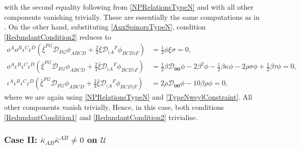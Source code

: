 \documentclass[10pt,a4paper]{article}
\newcommand\omicron{o}
\theoremstyle{plain}
\begin{document}
with the second equality following from \eqref{NPRelationsTypeN} and
with all other components vanishing trivially. These are essentially
the same computations as in \cite{BaeVal10c}. On the other hand,
substituting \eqref{AuxSpinorsTypeN}, condition
\eqref{RedundantCondition2} reduces to
\begin{align*}
\omicron^A\omicron^B\iota^C\iota^D\left(\bar{\xi}^{FG}\mathcal{D}_{FG}\phi_{ABCD}
+
\tfrac{2}{3}\bar{\xi}\mathcal{D}_{(A}{}^F\phi_{BCD)F}\right)&=\tfrac{1}{3}\phi
\xi
\sigma=0,\\ \omicron^A\iota^B\iota^C\iota^D\left(\bar{\xi}^{FG}\mathcal{D}_{FG}\phi_{ABCD}
+ \tfrac{2}{3}\bar{\xi}\mathcal{D}_{(A}{}^F\phi_{BCD)F}\right)&=
\tfrac{1}{2} \beta \mathcal{D}_{\bm0\bm0}\phi-2 \beta^2 \phi -
\tfrac{1}{2} \beta \kappa \phi - 2 \rho \sigma \phi + \tfrac{1}{2}
\beta \tau \phi
=0,\\ \iota^A\iota^B\iota^C\iota^D\left(\bar{\xi}^{FG}\mathcal{D}_{FG}\phi_{ABCD}
+ \tfrac{2}{3}\bar{\xi}\mathcal{D}_{(A}{}^F\phi_{BCD)F}\right) &= 2
\rho \mathcal{D}_{\bm0\bm0}\phi-10 \beta \rho \phi =0,
\end{align*}
where we are again using \eqref{NPRelationsTypeN} and
\eqref{TypeNweylConstraint}. All other components vanish
trivially. Hence, in this case, both conditions
\eqref{RedundantCondition1} and \eqref{RedundantCondition2}
trivialise.


\subsubsection{Case II: $\bar{\kappa}_{AB}\bar{\kappa}^{AB}\neq 0$ on $\mathcal{U}$}\label{TypeDCase}
\end{document}
